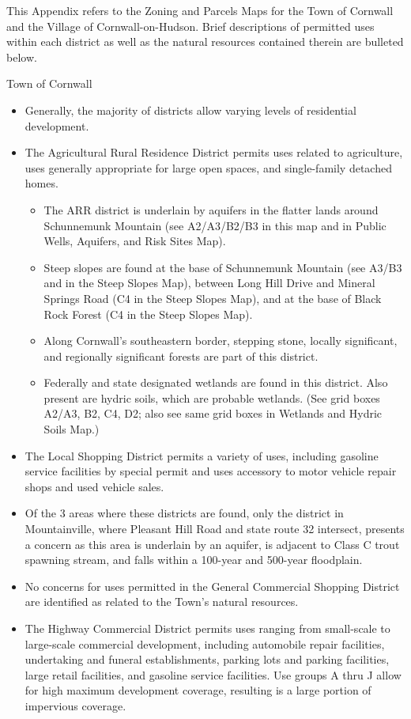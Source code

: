 This Appendix refers to the Zoning and Parcels Maps for the Town of Cornwall and the Village of Cornwall-on-Hudson. Brief descriptions of permitted uses within each district as well as the natural resources contained therein are bulleted below.

Town of Cornwall
\begin{itemize}
    \item Generally, the majority of districts allow varying levels of residential development.
    \item The Agricultural Rural Residence District permits uses related to agriculture, uses generally appropriate for large open spaces, and single-family detached homes.
    \begin{itemize}
        \item The ARR district is underlain by aquifers in the flatter lands around Schunnemunk Mountain (see A2/A3/B2/B3 in this map and in Public Wells, Aquifers, and Risk Sites Map).
        \item Steep slopes are found at the base of Schunnemunk Mountain (see A3/B3 and in the Steep Slopes Map), between Long Hill Drive and Mineral Springs Road (C4 in the Steep Slopes Map), and at the base of Black Rock Forest (C4 in the Steep Slopes Map).
        \item Along Cornwall’s southeastern border, stepping stone, locally significant, and regionally significant forests are part of this district.
        \item Federally and state designated wetlands are found in this district. Also present are hydric soils, which are probable wetlands. (See grid boxes A2/A3, B2, C4, D2; also see same grid boxes in Wetlands and Hydric Soils Map.)
    \end{itemize}
    \item The Local Shopping District permits a variety of uses, including gasoline service facilities by special permit and uses accessory to motor vehicle repair shops and used vehicle sales.
        \item Of the 3 areas where these districts are found, only the district in Mountainville, where Pleasant Hill Road and state route 32 intersect, presents a concern as this area is underlain by an aquifer, is adjacent to Class C trout spawning stream, and falls within a 100-year and 500-year floodplain.
    \item No concerns for uses permitted in the General Commercial Shopping District are identified as related to the Town’s natural resources.
    \item The Highway Commercial District permits uses ranging from small-scale to large-scale commercial development, including automobile repair facilities, undertaking and funeral establishments, parking lots and parking facilities, large retail facilities, and gasoline service facilities.  Use groups A thru J allow for high maximum development coverage, resulting is a large portion of impervious coverage.

\end{itemize}
